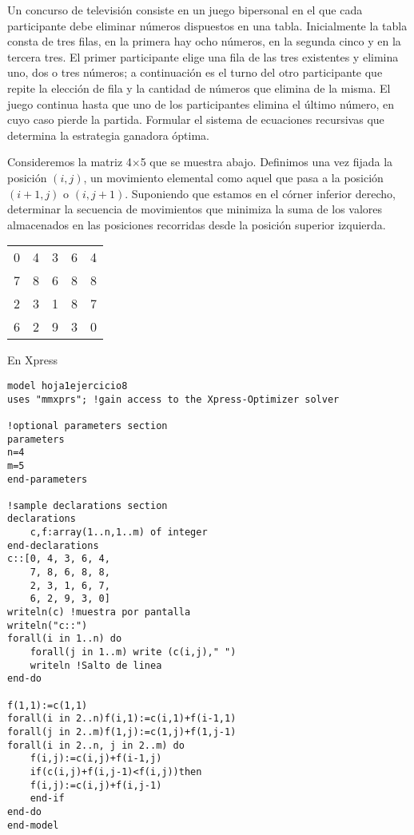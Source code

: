 \documentclass[twoside]{article}
\begin{document}
\newpage 
\begin{ejercicio}{7}
Un concurso de televisión consiste en un juego bipersonal en el que cada participante debe
eliminar números dispuestos en una tabla. Inicialmente la tabla consta de tres filas, en la primera
hay ocho números, en la segunda cinco y en la tercera tres. El primer participante elige una fila de
las tres existentes y elimina uno, dos o tres números; a continuación es el turno del otro participante
que repite la elección de fila y la cantidad de números que elimina de la misma. El juego continua
hasta que uno de los participantes elimina el último número, en cuyo caso pierde la partida.
Formular el sistema de ecuaciones recursivas que determina la estrategia ganadora óptima.
\end{ejercicio}
\begin{solucion}

\end{solucion}

\newpage
\begin{ejercicio}{8} 
Consideremos la matriz 4$\times$5 que se muestra abajo. Definimos una vez fijada la posición $(i, j)$,
un movimiento elemental como aquel que pasa a la posición $(i + 1, j)$ o $(i, j + 1)$. Suponiendo
que estamos en el córner inferior derecho, determinar la secuencia de movimientos que minimiza la
suma de los valores almacenados en las posiciones recorridas desde la posición superior izquierda.
\begin{center}
\begin{tabular}{c c c c c}
0 & 4 & 3 & 6 & 4\\
7 & 8 & 6 & 8 & 8\\
2 & 3 & 1 & 8 & 7\\
6 & 2 & 9 & 3 & 0
\end{tabular}
\end{center}
\end{ejercicio}
\begin{solucion}
En Xpress
\begin{verbatim}
model hoja1ejercicio8
uses "mmxprs"; !gain access to the Xpress-Optimizer solver

!optional parameters section
parameters
n=4
m=5
end-parameters

!sample declarations section
declarations
	c,f:array(1..n,1..m) of integer
end-declarations
c::[0, 4, 3, 6, 4,
	7, 8, 6, 8, 8,
	2, 3, 1, 6, 7,
	6, 2, 9, 3, 0]
writeln(c) !muestra por pantalla
writeln("c::")
forall(i in 1..n) do
	forall(j in 1..m) write (c(i,j)," ")
	writeln !Salto de linea
end-do

f(1,1):=c(1,1)
forall(i in 2..n)f(i,1):=c(i,1)+f(i-1,1)
forall(j in 2..m)f(1,j):=c(1,j)+f(1,j-1)
forall(i in 2..n, j in 2..m) do
	f(i,j):=c(i,j)+f(i-1,j)
	if(c(i,j)+f(i,j-1)<f(i,j))then
	f(i,j):=c(i,j)+f(i,j-1)
	end-if
end-do
end-model

\end{verbatim}
\end{solucion}
\end{document}
